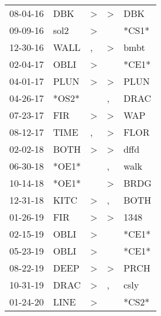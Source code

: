 \begin{supertabular}{lllll}
 08-04-16 &    DBK &     \textgreater &  \textgreater &    DBK \\
 09-09-16 &   sol2 &     \textgreater &               &  *CS1* \\
 12-30-16 &   WALL &                , &  \textgreater &   bmbt \\
 02-04-17 &   OBLI &     \textgreater &               &  *CE1* \\
 04-01-17 &   PLUN &     \textgreater &  \textgreater &   PLUN \\
 04-26-17 &  *OS2* &                  &             , &   DRAC \\
 07-23-17 &    FIR &     \textgreater &  \textgreater &    WAP \\
 08-12-17 &   TIME &                , &  \textgreater &   FLOR \\
 02-02-18 &   BOTH &     \textgreater &  \textgreater &   dffd \\
 06-30-18 &  *OE1* &                  &             , &   walk \\
 10-14-18 &  *OE1* &                  &  \textgreater &   BRDG \\
 12-31-18 &   KITC &     \textgreater &             , &   BOTH \\
 01-26-19 &    FIR &     \textgreater &  \textgreater &   1348 \\
 02-15-19 &   OBLI &     \textgreater &               &  *CE1* \\
 05-23-19 &   OBLI &     \textgreater &               &  *CE1* \\
 08-22-19 &   DEEP &     \textgreater &  \textgreater &   PRCH \\
 10-31-19 &   DRAC &     \textgreater &             , &   csly \\
 01-24-20 &   LINE &     \textgreater &               &  *CS2* \\
\end{supertabular}
